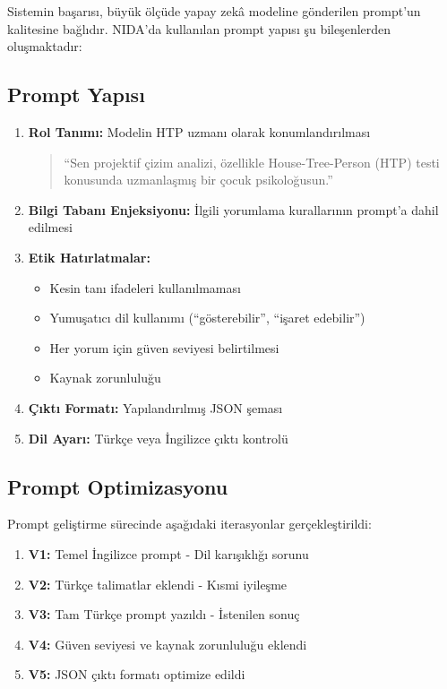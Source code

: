 Sistemin başarısı, büyük ölçüde yapay zekâ modeline gönderilen prompt'un kalitesine bağlıdır. NIDA'da kullanılan prompt yapısı şu bileşenlerden oluşmaktadır:

\subsection{Prompt Yapısı}

\begin{enumerate}
  \item \textbf{Rol Tanımı:} Modelin HTP uzmanı olarak konumlandırılması
  \begin{quote}
  ``Sen projektif çizim analizi, özellikle House-Tree-Person (HTP) testi konusunda uzmanlaşmış bir çocuk psikoloğusun.''
  \end{quote}

  \item \textbf{Bilgi Tabanı Enjeksiyonu:} İlgili yorumlama kurallarının prompt'a dahil edilmesi

  \item \textbf{Etik Hatırlatmalar:}
  \begin{itemize}
    \item Kesin tanı ifadeleri kullanılmaması
    \item Yumuşatıcı dil kullanımı (``gösterebilir'', ``işaret edebilir'')
    \item Her yorum için güven seviyesi belirtilmesi
    \item Kaynak zorunluluğu
  \end{itemize}

  \item \textbf{Çıktı Formatı:} Yapılandırılmış JSON şeması

  \item \textbf{Dil Ayarı:} Türkçe veya İngilizce çıktı kontrolü
\end{enumerate}

\subsection{Prompt Optimizasyonu}

Prompt geliştirme sürecinde aşağıdaki iterasyonlar gerçekleştirildi:

\begin{enumerate}
  \item \textbf{V1:} Temel İngilizce prompt - Dil karışıklığı sorunu
  \item \textbf{V2:} Türkçe talimatlar eklendi - Kısmi iyileşme
  \item \textbf{V3:} Tam Türkçe prompt yazıldı - İstenilen sonuç
  \item \textbf{V4:} Güven seviyesi ve kaynak zorunluluğu eklendi
  \item \textbf{V5:} JSON çıktı formatı optimize edildi
\end{enumerate}

